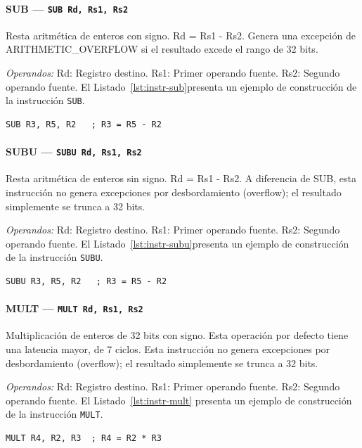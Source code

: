 \documentclass[../main.tex]{subfiles}
\begin{document}
\paragraph*{SUB --- \texttt{SUB Rd, Rs1, Rs2}}
Resta aritmética de enteros con signo. Rd = Rs1 - Rs2. Genera una excepción de ARITHMETIC\_OVERFLOW si el resultado excede el rango de 32 bits.

\textit{Operandos:} Rd: Registro destino. Rs1: Primer operando fuente. Rs2: Segundo operando fuente.
El Listado~\ref{lst:instr-sub}presenta un ejemplo de construcción de la instrucción \texttt{SUB}.

\begin{lstlisting}[caption={SUB},label={lst:instr-sub}]
	SUB R3, R5, R2   ; R3 = R5 - R2
\end{lstlisting}

\paragraph*{SUBU --- \texttt{SUBU Rd, Rs1, Rs2}}
Resta aritmética de enteros sin signo. Rd = Rs1 - Rs2. A diferencia de SUB, esta instrucción no genera excepciones por desbordamiento (overflow); el resultado simplemente se trunca a 32 bits.

\textit{Operandos:} Rd: Registro destino. Rs1: Primer operando fuente. Rs2: Segundo operando fuente.
El Listado~\ref{lst:instr-subu}presenta un ejemplo de construcción de la instrucción \texttt{SUBU}.

\begin{lstlisting}[caption={SUBU},label={lst:instr-subu}]
	SUBU R3, R5, R2   ; R3 = R5 - R2
\end{lstlisting}

\paragraph*{MULT --- \texttt{MULT Rd, Rs1, Rs2}}
Multiplicación de enteros de 32 bits con signo. Esta operación por defecto tiene una latencia mayor, de 7 ciclos. Esta instrucción no genera excepciones por desbordamiento (overflow); el resultado simplemente se trunca a 32 bits.

\textit{Operandos:} Rd: Registro destino. Rs1: Primer operando fuente. Rs2: Segundo operando fuente.
El Listado~\ref{lst:instr-mult} presenta un ejemplo de construcción de la instrucción \texttt{MULT}.

\begin{lstlisting}[caption={MULT},label={lst:instr-mult}]
	MULT R4, R2, R3  ; R4 = R2 * R3
\end{lstlisting}
\end{document}
